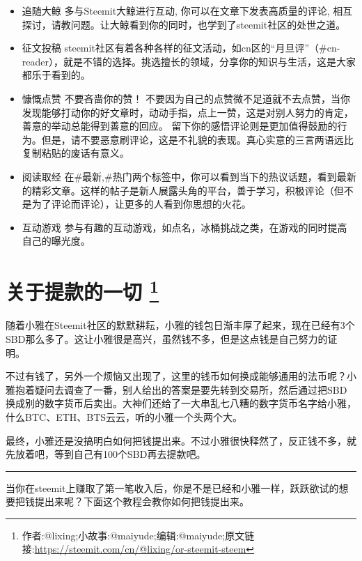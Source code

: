 \documentclass[]{ctexbook}
\begin{document}
\begin{itemize}
\item
  追随大鲸
  多与Steemit大鲸进行互动, 你可以在文章下发表高质量的评论, 相互探讨，请教问题。让大鲸看到你的同时，也学到了steemit社区的处世之道。
\item
  征文投稿
  steemit社区有着各种各样的征文活动，如cn区的``月旦评''（\#cn-reader），就是不错的选择。挑选擅长的领域，分享你的知识与生活，这是大家都乐于看到的。
\item
  慷慨点赞
  不要吝啬你的赞！
  不要因为自己的点赞微不足道就不去点赞，当你发现能够打动你的好文章时，动动手指，点上一赞，这是对别人努力的肯定，善意的举动总能得到善意的回应。
  留下你的感悟评论则是更加值得鼓励的行为。但是，请不要恶意刷评论，这是不礼貌的表现。真心实意的三言两语远比复制粘贴的废话有意义。
\item
  阅读取经
  在\#最新,\#热门两个标签中，你可以看到当下的热议话题，看到最新的精彩文章。这样的帖子是新人展露头角的平台，善于学习，积极评论（但不是为了评论而评论），让更多的人看到你思想的火花。
\item
  互动游戏
  参与有趣的互动游戏，如点名，冰桶挑战之类，在游戏的同时提高自己的曝光度。
\end{itemize}

\section[关于提款的一切 ]{\texorpdfstring{关于提款的一切 \footnote{作者:@lixing;小故事:@maiyude;编辑:@maiyude;原文链接:\url{https://steemit.com/cn/@lixing/or-steemit-steem}}}{关于提款的一切 }}

随着小雅在Steemit社区的默默耕耘，小雅的钱包日渐丰厚了起来，现在已经有3个SBD那么多了。这让小雅很是高兴，虽然钱不多，但是这点钱是自己努力的证明。

不过有钱了，另外一个烦恼又出现了，这里的钱币如何换成能够通用的法币呢？小雅抱着疑问去调查了一番，别人给出的答案是要先转到交易所，然后通过把SBD换成别的数字货币后卖出。大神们还给了一大串乱七八糟的数字货币名字给小雅，什么BTC、ETH、BTS云云，听的小雅一个头两个大。

最终，小雅还是没搞明白如何把钱提出来。不过小雅很快释然了，反正钱不多，就先放着吧，等到自己有100个SBD再去提款吧。

\begin{center}\rule{0.5\linewidth}{\linethickness}\end{center}

当你在steemit上赚取了第一笔收入后，你是不是已经和小雅一样，跃跃欲试的想要把钱提出来呢？下面这个教程会教你如何把钱提出来。
\end{document}
